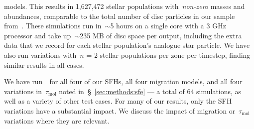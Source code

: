 \documentclass[draft2.tex]{subfiles}
\begin{document}
models. 
This results in 1,627,472 stellar populations with~\textit{non-zero} masses and 
abundances, comparable to the total number of disc particles in our sample 
from~\hsim. 
These simulations run in~$\sim$5 hours on a single core with a 3 GHz 
processor and take up~$\sim$235 MB of disc space per output, including the 
extra data that we record for each stellar population's analogue star particle. 
We have also run variations with~$n$ = 2 stellar populations per 
zone per timestep, finding similar results in all cases. 
\par 
We have run~\vice~for all four of our SFHs, all four migration 
models, and all four variations in~$\tau_\text{mol}$ noted 
in~\S~\ref{sec:methods:sfe} --- a total of 64 simulations, as well as a variety 
of other test cases. 
For many of our results, only the SFH variations have a substantial impact. 
We discuss the impact of migration or~$\tau_\text{mol}$ variations where they 
are relevant. 
\end{document}
